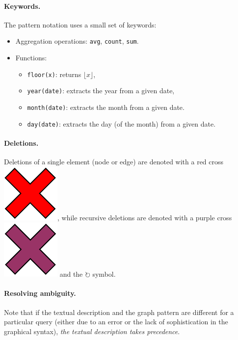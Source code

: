 \paragraph{Keywords.} The pattern notation uses a small set of keywords:

\begin{itemize}
	\item Aggregation operations:
	\lstinline{avg},
	\lstinline{count}, 
	\lstinline{sum}.
	\item Functions:
	\begin{itemize}
		\item \lstinline{floor(x)}: returns $\lfloor x \rfloor$,
		\item \lstinline{year(date)}: extracts the year from a given date,
		\item \lstinline{month(date)}: extracts the month from a given date.
		\item \lstinline{day(date)}: extracts the day (of the month) from a given date.
	\end{itemize}
\end{itemize}

\paragraph{Deletions.}

Deletions of a single element (node or edge) are denoted with a red cross \includegraphics[scale=0.14]{patterns/delete-single}, while recursive deletions are denoted with a purple cross \includegraphics[scale=0.14]{patterns/delete-recursively} and the $\circlearrowright$ symbol.

\paragraph{Resolving ambiguity.} Note that if the textual description and the graph pattern are different for a particular query (either due to an error or the lack of sophistication in the graphical syntax), \emph{the textual description takes precedence}.

